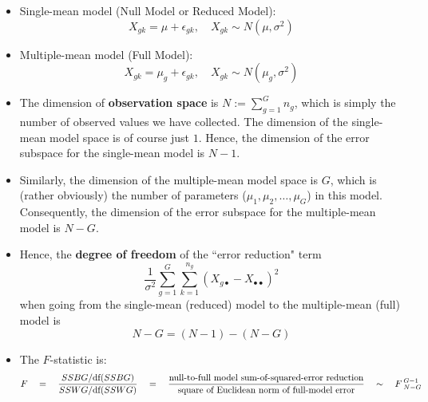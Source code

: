 \begin{remark}\mbox{}\vskip 0.0cm
\begin{itemize}
\item  Single-mean model (Null Model or Reduced Model):
\begin{equation*}
X_{gk} = \mu + \epsilon_{gk},
\quad
X_{gk} \sim N(\mu,\sigma^{2})
\end{equation*}
\item  Multiple-mean model (Full Model):
\begin{equation*}
X_{gk} = \mu_{g} + \epsilon_{gk},
\quad
X_{gk} \sim N(\mu_{g},\sigma^{2})
\end{equation*}

\item The dimension of \textbf{observation space} is $N := \sum_{g=1}^{G} n_{g}$, which is
simply the number of observed values we have collected.
The dimension of the single-mean model space is of course just $1$.
Hence, the dimension of the error subspace for the single-mean model is $N - 1$.

\item Similarly, the dimension of the multiple-mean model space is $G$, which is (rather obviously)
the number of parameters ($\mu_{1}, \mu_{2}, \ldots, \mu_{G}$) in this model.  Consequently,
the dimension of the error subspace for the multiple-mean model is $N - G$.

\item Hence, the \textbf{degree of freedom} of the ``error reduction" term
	\begin{equation*}
	\dfrac{1}{\sigma^{2}}\sum_{g=1}^{G} \sum_{k=1}^{n_{g}} \left(X_{g\bullet} - X_{\bullet\bullet}\right)^{2} 
	\end{equation*}
when going from the single-mean (reduced) model to the multiple-mean (full) model is
\begin{equation*}
N -G = (N-1) - (N-G)
\end{equation*}

\item The $F$-statistic is:
\begin{equation*}
F \quad = \quad
\dfrac{SSBG/\textnormal{df}(SSBG)}{SSWG/\textnormal{df}(SSWG)}
\quad = \quad
\dfrac{\textnormal{null-to-full model sum-of-squared-error reduction}}{\textnormal{square of Euclidean norm of full-model error}}
\quad \sim \quad
F\,_{N-G}^{G-1}
\end{equation*}
\end{itemize}


\end{remark}
